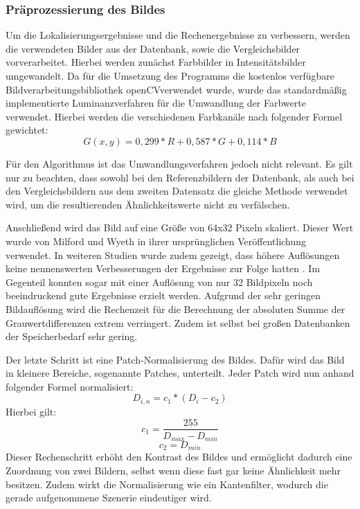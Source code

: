 \documentclass[12pt,a4paper,titlepage]{scrartcl}
\begin{document}
\subsubsection{Präprozessierung des Bildes}
Um die Lokalisierungsergebnisse und die Rechenergebnisse zu verbessern, werden die verwendeten Bilder aus der Datenbank, sowie die Vergleichsbilder vorverarbeitet. Hierbei werden zunächst Farbbilder in Intensitätsbilder umgewandelt. Da für die Umsetzung des Programms die kostenlos verfügbare Bildverarbeitungsbibliothek \glqq openCV\grqq verwendet wurde, wurde das standardmäßig implementierte Luminanzverfahren für die Umwandlung der Farbwerte verwendet. Hierbei werden die verschiedenen Farbkanäle nach folgender Formel gewichtet:
\begin{equation}
G(x,y)=0{,}299*R+0{,}587*G+0{,}114*B
\end{equation}

Für den Algorithmus ist das Umwandlungsverfahren jedoch nicht relevant. Es gilt nur zu beachten, dass sowohl bei den Referenzbildern der Datenbank, als auch bei den Vergleichsbildern aus dem zweiten Datensatz die gleiche Methode verwendet wird, um die resultierenden Ähnlichkeitswerte nicht zu verfälschen.

Anschließend wird das Bild auf eine Größe von 64x32 Pixeln skaliert. Dieser Wert wurde von Milford und Wyeth in ihrer ursprünglichen Veröffentlichung verwendet. In weiteren Studien wurde zudem gezeigt, dass höhere Auflösungen keine nennenswerten Verbesserungen der Ergebnisse zur Folge hatten \cite{milford2013vision}. Im Gegenteil konnten sogar mit einer Auflösung von nur 32 Bildpixeln noch beeindruckend gute Ergebnisse erzielt werden. Aufgrund der sehr geringen Bildauflösung wird die Rechenzeit für die Berechnung der absoluten Summe der Grauwertdifferenzen extrem verringert. Zudem ist selbst bei großen Datenbanken der Speicherbedarf sehr gering.

Der letzte Schritt ist eine Patch-Normalisierung des Bildes. Dafür wird das Bild in kleinere Bereiche, sogenannte Patches, unterteilt. Jeder Patch wird nun anhand folgender Formel normalisiert: 
\begin{equation}
D_{i,n}=c_1*(D_i-c_2)
\end{equation}
Hierbei gilt: 
\begin{equation*}
c_1=\frac{255}{D_{max}-D_{min}}
\end{equation*}
\begin{equation*}
c_2=D_{min}
\end{equation*}
Dieser Rechenschritt erhöht den Kontrast des Bildes und ermöglicht dadurch eine Zuordnung von zwei Bildern, selbst wenn diese fast gar keine Ähnlichkeit mehr besitzen. Zudem wirkt die Normalisierung wie ein Kantenfilter, wodurch die gerade aufgenommene Szenerie eindeutiger wird.
\end{document}
